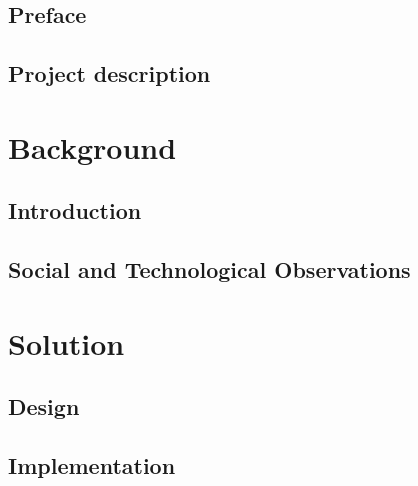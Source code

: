 \documentclass[a4paper,11pt,fleqn,twoside,openright]{memoir} 	%
\begin{document}

\frontmatter


\cleardoublepage

\cleardoublepage

\chapter*{Preface}


\cleardoublepage

{}
\tableofcontents*
\listoftodos[Notes] %

\mainmatter

\chapter{Project description}


\part{Background}
\chapter{Introduction}


\chapter{Social and Technological Observations}



\part{Solution} %

\chapter{Design}
%

\chapter{Implementation}
%
\end{document}
